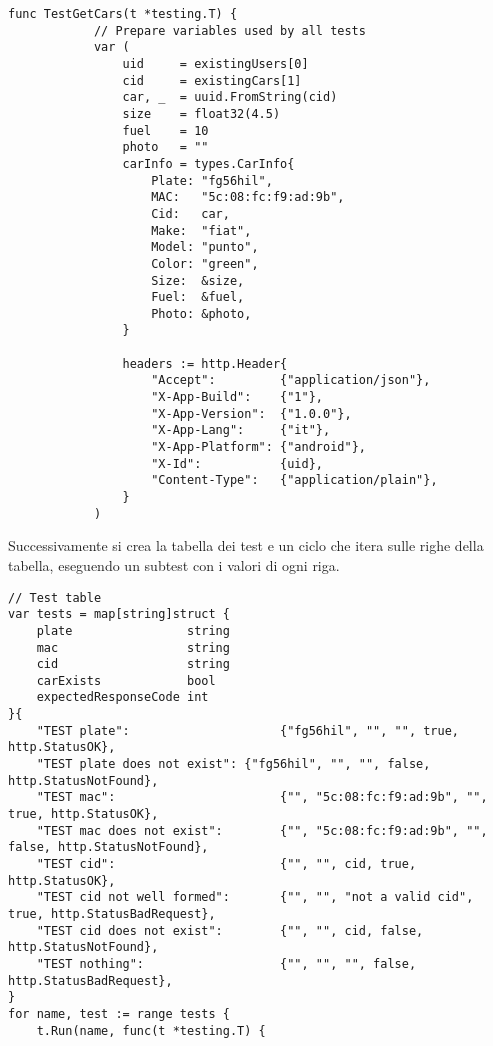 \documentclass[italian, oneside]{sapthesis} %
\begin{document}

	  \enlargethispage*{2\baselineskip}
	  \begin{lstlisting}[]
		func TestGetCars(t *testing.T) {
			// Prepare variables used by all tests
			var (
				uid     = existingUsers[0]
				cid     = existingCars[1]
				car, _  = uuid.FromString(cid)
				size    = float32(4.5)
				fuel    = 10
				photo   = ""
				carInfo = types.CarInfo{
					Plate: "fg56hil",
					MAC:   "5c:08:fc:f9:ad:9b",
					Cid:   car,
					Make:  "fiat",
					Model: "punto",
					Color: "green",
					Size:  &size,
					Fuel:  &fuel,
					Photo: &photo,
				}

				headers := http.Header{
					"Accept":         {"application/json"},
					"X-App-Build":    {"1"},
					"X-App-Version":  {"1.0.0"},
					"X-App-Lang":     {"it"},
					"X-App-Platform": {"android"},
					"X-Id":           {uid},
					"Content-Type":   {"application/plain"},
				}
			)
		\end{lstlisting}

		Successivamente si crea la tabella dei test e un ciclo che itera sulle righe della tabella, eseguendo un subtest con i valori di ogni riga.

		\begin{lstlisting}[]
// Test table
var tests = map[string]struct {
	plate                string
	mac                  string
	cid                  string
	carExists            bool
	expectedResponseCode int
}{
	"TEST plate":                	  {"fg56hil", "", "", true, http.StatusOK},
	"TEST plate does not exist": {"fg56hil", "", "", false, http.StatusNotFound},
	"TEST mac":                  	  {"", "5c:08:fc:f9:ad:9b", "", true, http.StatusOK},
	"TEST mac does not exist":   	  {"", "5c:08:fc:f9:ad:9b", "", false, http.StatusNotFound},
	"TEST cid":                  	  {"", "", cid, true, http.StatusOK},
	"TEST cid not well formed":  	  {"", "", "not a valid cid", true, http.StatusBadRequest},
	"TEST cid does not exist":   	  {"", "", cid, false, http.StatusNotFound},
	"TEST nothing":              	  {"", "", "", false, http.StatusBadRequest},
}
for name, test := range tests {
	t.Run(name, func(t *testing.T) {
		\end{lstlisting}
\end{document}
